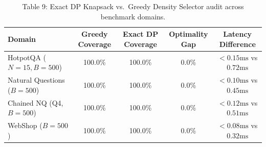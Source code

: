 \documentclass{article}
\begin{document}
\begin{table}[h]
\caption{Table 9: Exact DP Knapsack vs.\ Greedy Density Selector audit across benchmark domains.}
\centering
\begin{tabular}{lcccc}
\toprule
Domain & Greedy Coverage & Exact DP Coverage & Optimality Gap & Latency Difference \\
\midrule
HotpotQA ($N{=}15, B{=}500$) & 100.0\% & 100.0\% & 0.0\% & $< 0.15\text{ms}$ vs $0.72\text{ms}$ \\
Natural Questions ($B{=}500$) & 100.0\% & 100.0\% & 0.0\% & $< 0.10\text{ms}$ vs $0.45\text{ms}$ \\
Chained NQ (Q4, $B{=}500$) & 100.0\% & 100.0\% & 0.0\% & $< 0.12\text{ms}$ vs $0.51\text{ms}$ \\
WebShop ($B{=}500$) & 100.0\% & 100.0\% & 0.0\% & $< 0.08\text{ms}$ vs $0.32\text{ms}$ \\
\bottomrule
\end{tabular}
\end{table}

\clearpage

\end{document}
